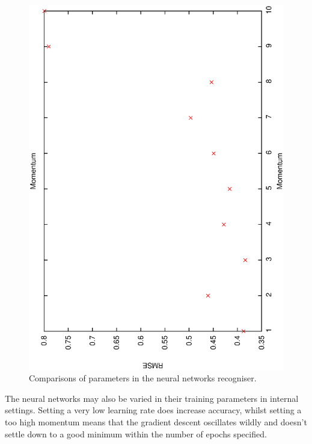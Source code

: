 \documentclass[12pt,a4,notitlepage]{report}
\renewcommand{\_}{\texttt{\symbol{95}}}
\newcommand{\<}{\texttt{\symbol{60}}}
\renewcommand{\>}{\texttt{\symbol{62}}}
\begin{document}
\begin{figure}
\includegraphics[scale=0.3,angle=-90]{results/neural_err/n_momentum.ps}
\caption{Comparisons of parameters in the neural networks recogniser.}
\label{n_floatparameters}
\end{figure}

The neural networks may also be varied in their training parameters in internal settings. Setting a very low learning rate does increase accuracy, whilst setting a too high momentum means that the gradient descent oscillates wildly and doesn't settle down to a good minimum within the number of epochs specified.
\end{document}
